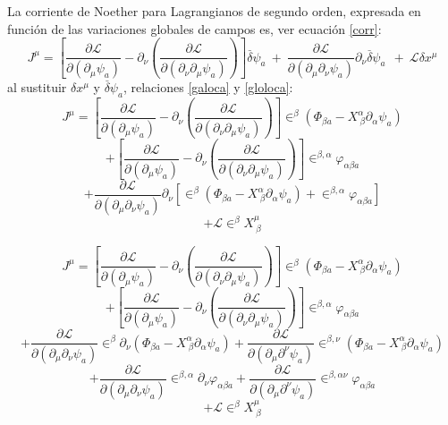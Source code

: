 \documentclass[a4paper,12pt]{article}
\begin{document}
La corriente de Noether para Lagrangianos de segundo orden, expresada en función de las variaciones globales de campos es, ver ecuación \eqref{corr}:
\begin{equation}
J^\mu=\left[\frac{\partial \mathscr{L} }{\partial(\partial_{\mu} \psi_a)}-\partial_{\nu}\left(\frac{\partial\mathscr{L} }{\partial(\partial_{\nu}\partial_{\mu} \psi_a)}  \right) \right]\overset{\_}{\delta}\psi_a\ +\ \frac{\partial\mathscr{L} }{\partial(\partial_{\mu}\partial_{\nu} \psi_a)}\partial_{\nu}\overset{\_}{\delta} \psi_a\ \ + \ \mathscr{L}\delta x^\mu
\end{equation}
al sustituir $\delta x^\mu$ y $\overset{\_}{\delta}\psi_a$, relaciones \eqref{galoca} y \eqref{gloloca}:  
\begin{equation}
J^\mu=\left[\frac{\partial \mathscr{L} }{\partial(\partial_{\mu} \psi_a)}-\partial_{\nu}\left(\frac{\partial\mathscr{L} }{\partial(\partial_{\nu}\partial_{\mu} \psi_a)}  \right) \right]\in^\beta(\Phi_{\beta a}-X_{\ \beta}^\alpha\partial_\alpha\psi_a)
\end{equation}
$$+\left[\frac{\partial \mathscr{L} }{\partial(\partial_{\mu} \psi_a)}-\partial_{\nu}\left(\frac{\partial\mathscr{L} }{\partial(\partial_{\nu}\partial_{\mu} \psi_a)}  \right) \right]\in^{\beta,\alpha}\varphi_{\alpha\beta a}$$
$$+\frac{\partial\mathscr{L} }{\partial(\partial_{\mu}\partial_{\nu} \psi_a)}\partial_{\nu}\left[\in^\beta(\Phi_{\beta a}-X_{\ \beta}^\alpha\partial_\alpha\psi_a)+\in^{\beta,\alpha}\varphi_{\alpha\beta a}\right]$$
$$+\mathscr{L}\in^\beta X_{\ \beta}^\mu$$
\vspace{0,1cm}

\begin{equation}
J^\mu=\left[\frac{\partial \mathscr{L} }{\partial(\partial_{\mu} \psi_a)}-\partial_{\nu}\left(\frac{\partial\mathscr{L} }{\partial(\partial_{\nu}\partial_{\mu} \psi_a)}  \right) \right]\in^\beta(\Phi_{\beta a}-X_{\ \beta}^\alpha\partial_\alpha\psi_a)
\end{equation}
$$+\left[\frac{\partial \mathscr{L} }{\partial(\partial_{\mu} \psi_a)}-\partial_{\nu}\left(\frac{\partial\mathscr{L} }{\partial(\partial_{\nu}\partial_{\mu} \psi_a)}  \right) \right]\in^{\beta,\alpha}\varphi_{\alpha\beta a}$$
$$+\frac{\partial\mathscr{L} }{\partial(\partial_{\mu}\partial_{\nu} \psi_a)}\in^\beta\partial_{\nu}(\Phi_{\beta a}-X_{\ \beta}^\alpha\partial_\alpha\psi_a)+\frac{\partial\mathscr{L} }{\partial(\partial_{\mu}\partial^{\nu} \psi_a)}\in^{\beta,\nu}(\Phi_{\beta a}-X_{\ \beta}^\alpha\partial_\alpha\psi_a)$$
$$+\frac{\partial\mathscr{L} }{\partial(\partial_{\mu}\partial_{\nu} \psi_a)}\in^{\beta,\alpha}\partial_{\nu}\varphi_{\alpha\beta a}+\frac{\partial\mathscr{L} }{\partial(\partial_{\mu}\partial^{\nu} \psi_a)}\in^{\beta,\alpha\nu}\varphi_{\alpha\beta a}$$
$$+\mathscr{L}\in^\beta X_{\ \beta}^\mu$$
\vspace{0,1cm}
\end{document}

